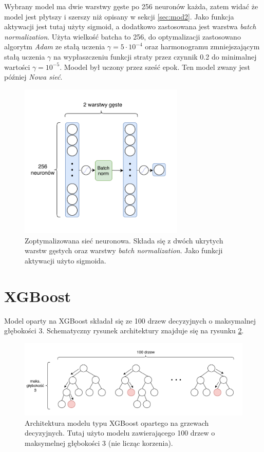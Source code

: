 \documentclass{pracalicmgr}
\begin{document}
	Wybrany model ma dwie warstwy gęste po 256 neuronów każda, zatem widać że model jest płytszy i szerszy niż opisany w sekcji \ref{sec:mod2}. Jako funkcja aktywacji jest tutaj użyty sigmoid, a dodatkowo zastosowana jest warstwa \textit{batch normalization}. Użyta wielkość batcha to 256, do optymalizacji  zastosowano algorytm \textit{Adam} ze stałą uczenia $\gamma = 5\cdot 10^{-4}$ oraz harmonogramu zmniejszającym stałą uczenia $\gamma$ na wypłaszczeniu funkcji straty przez czynnik 0.2 do minimalnej wartości $\gamma = 10^{-5}$. Moodel był uczony przez sześć epok. Ten model zwany jest później \textit{Nowa sieć}.
	\begin{figure}
	\centering
	\includegraphics[width=0.7\textwidth]{best_neural_net.pdf}
	\caption{Zoptymalizowana sieć neuronowa. Składa się z dwóch ukrytych warstw gęstych oraz warstwy \textit{batch normalization}. Jako funkcji aktywacji użyto sigmoida.}
	\label{fig:nn2}
	\end{figure}	
	
	\section{XGBoost}
	Model oparty na XGBoost składał się ze 100 drzew decyzyjnych o maksymalnej głębokości 3. Schematyczny rysunek architektury znajduje się na rysunku \ref{fig:xgb}. %
	\begin{figure}
	\centering
	\includegraphics[width=1.0\textwidth]{xgb.pdf}
	\caption{Architektura modelu typu XGBoost opartego na grzewach decyzyjnych. Tutaj użyto modelu zawierającego 100 drzew o maksymelnej głębokości 3 (nie licząc korzenia).}
	\label{fig:xgb}
	\end{figure}
    
\end{document}
